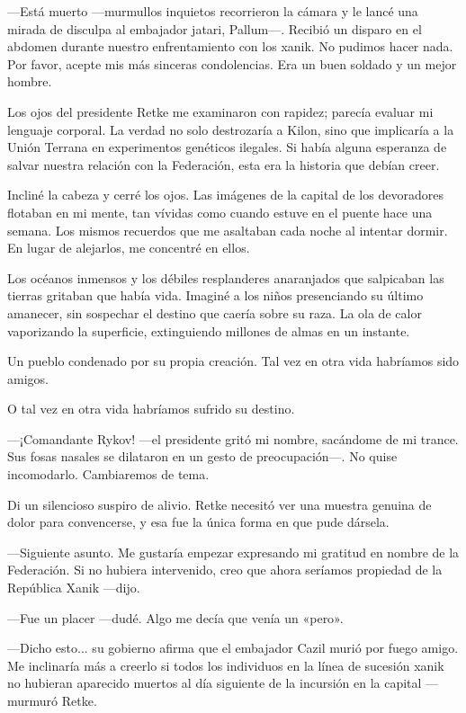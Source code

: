 —Está muerto —murmullos inquietos recorrieron la cámara y le lancé una mirada de disculpa al embajador jatari, Pallum—. Recibió un disparo en el abdomen durante nuestro enfrentamiento con los xanik. No pudimos hacer nada. Por favor, acepte mis más sinceras condolencias. Era un buen soldado y un mejor hombre.

Los ojos del presidente Retke me examinaron con rapidez; parecía evaluar mi lenguaje corporal. La verdad no solo destrozaría a Kilon, sino que implicaría a la Unión Terrana en experimentos genéticos ilegales. Si había alguna esperanza de salvar nuestra relación con la Federación, esta era la historia que debían creer.

Incliné la cabeza y cerré los ojos. Las imágenes de la capital de los devoradores flotaban en mi mente, tan vívidas como cuando estuve en el puente hace una semana. Los mismos recuerdos que me asaltaban cada noche al intentar dormir. En lugar de alejarlos, me concentré en ellos.

Los océanos inmensos y los débiles resplanderes anaranjados que salpicaban las tierras gritaban que había vida. Imaginé a los niños presenciando su último amanecer, sin sospechar el destino que caería sobre su raza. La ola de calor vaporizando la superficie, extinguiendo millones de almas en un instante.

Un pueblo condenado por su propia creación. Tal vez en otra vida habríamos sido amigos.

O tal vez en otra vida habríamos sufrido su destino.

—¡Comandante Rykov! —el presidente gritó mi nombre, sacándome de mi trance. Sus fosas nasales se dilataron en un gesto de preocupación—. No quise incomodarlo. Cambiaremos de tema.

Di un silencioso suspiro de alivio. Retke necesitó ver una muestra genuina de dolor para convencerse, y esa fue la única forma en que pude dársela.

—Siguiente asunto. Me gustaría empezar expresando mi gratitud en nombre de la Federación. Si no hubiera intervenido, creo que ahora seríamos propiedad de la República Xanik —dijo.

—Fue un placer —dudé. Algo me decía que venía un «pero».

—Dicho esto... su gobierno afirma que el embajador Cazil murió por fuego amigo. Me inclinaría más a creerlo si todos los individuos en la línea de sucesión xanik no hubieran aparecido muertos al día siguiente de la incursión en la capital —murmuró Retke.

